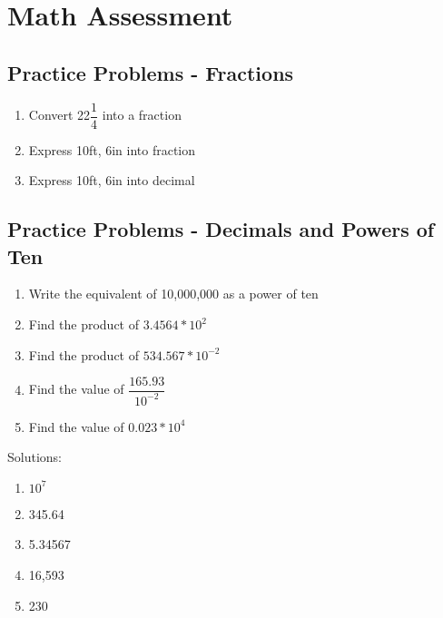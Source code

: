 
\chapter{Math Assessment}

\section*{Practice Problems - Fractions}
\begin{enumerate}
\item Convert 22$\dfrac{1}{4}$ into a fraction
\item Express 10ft, 6in into fraction
\item Express 10ft, 6in into decimal
\end{enumerate}

\vspace{1cm}
\section*{Practice Problems - Decimals and Powers of Ten}
\begin{enumerate}
\item Write the equivalent of 10,000,000 as a power of ten
\item Find the product of $3.4564*10^2$
\item Find the product of $534.567*10^{-2}$
\vspace{0.2cm}
\item Find the value of $\dfrac{165.93}{10^{-2}}$
\vspace{0.2cm}
\item Find the value of $0.023*10^4$
\end{enumerate}
\vspace{1cm}
Solutions:\\
\begin{enumerate}
\item $10^7$
\item 345.64
\item 5.34567
\item 16,593
\item 230
\end{enumerate}
